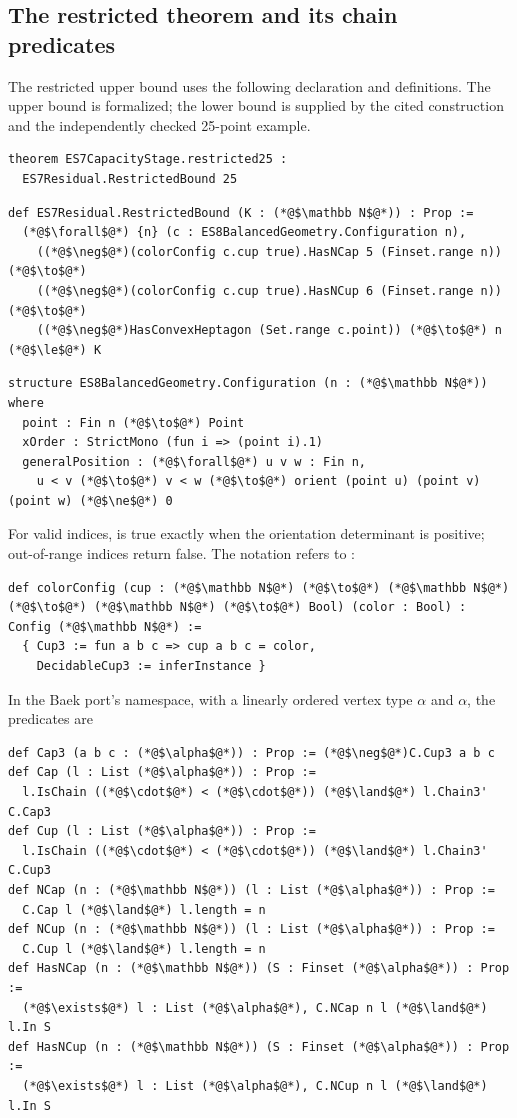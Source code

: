 \begingroup
\lstset{aboveskip=3pt,belowskip=3pt}
\subsection{The restricted theorem and its chain predicates}
The restricted upper bound uses the following declaration and definitions.
The upper bound is formalized; the lower bound is supplied by the cited
construction and the independently checked 25-point example.
\begin{lstlisting}
theorem ES7CapacityStage.restricted25 :
  ES7Residual.RestrictedBound 25
\end{lstlisting}
\begin{lstlisting}
def ES7Residual.RestrictedBound (K : (*@$\mathbb N$@*)) : Prop :=
  (*@$\forall$@*) {n} (c : ES8BalancedGeometry.Configuration n),
    ((*@$\neg$@*)(colorConfig c.cup true).HasNCap 5 (Finset.range n)) (*@$\to$@*)
    ((*@$\neg$@*)(colorConfig c.cup true).HasNCup 6 (Finset.range n)) (*@$\to$@*)
    ((*@$\neg$@*)HasConvexHeptagon (Set.range c.point)) (*@$\to$@*) n (*@$\le$@*) K
\end{lstlisting}
\begin{lstlisting}
structure ES8BalancedGeometry.Configuration (n : (*@$\mathbb N$@*)) where
  point : Fin n (*@$\to$@*) Point
  xOrder : StrictMono (fun i => (point i).1)
  generalPosition : (*@$\forall$@*) u v w : Fin n,
    u < v (*@$\to$@*) v < w (*@$\to$@*) orient (point u) (point v) (point w) (*@$\ne$@*) 0
\end{lstlisting}
For valid indices,  is true exactly when the
orientation determinant is positive; out-of-range indices return false.
The notation  refers to :
\begin{lstlisting}
def colorConfig (cup : (*@$\mathbb N$@*) (*@$\to$@*) (*@$\mathbb N$@*) (*@$\to$@*) (*@$\mathbb N$@*) (*@$\to$@*) Bool) (color : Bool) : Config (*@$\mathbb N$@*) :=
  { Cup3 := fun a b c => cup a b c = color,
    DecidableCup3 := inferInstance }
\end{lstlisting}
In the Baek port's  namespace, with a linearly ordered
vertex type $\alpha$ and  $\alpha$, the predicates are
\begin{lstlisting}
def Cap3 (a b c : (*@$\alpha$@*)) : Prop := (*@$\neg$@*)C.Cup3 a b c
def Cap (l : List (*@$\alpha$@*)) : Prop :=
  l.IsChain ((*@$\cdot$@*) < (*@$\cdot$@*)) (*@$\land$@*) l.Chain3' C.Cap3
def Cup (l : List (*@$\alpha$@*)) : Prop :=
  l.IsChain ((*@$\cdot$@*) < (*@$\cdot$@*)) (*@$\land$@*) l.Chain3' C.Cup3
def NCap (n : (*@$\mathbb N$@*)) (l : List (*@$\alpha$@*)) : Prop :=
  C.Cap l (*@$\land$@*) l.length = n
def NCup (n : (*@$\mathbb N$@*)) (l : List (*@$\alpha$@*)) : Prop :=
  C.Cup l (*@$\land$@*) l.length = n
def HasNCap (n : (*@$\mathbb N$@*)) (S : Finset (*@$\alpha$@*)) : Prop :=
  (*@$\exists$@*) l : List (*@$\alpha$@*), C.NCap n l (*@$\land$@*) l.In S
def HasNCup (n : (*@$\mathbb N$@*)) (S : Finset (*@$\alpha$@*)) : Prop :=
  (*@$\exists$@*) l : List (*@$\alpha$@*), C.NCup n l (*@$\land$@*) l.In S
\end{lstlisting}
